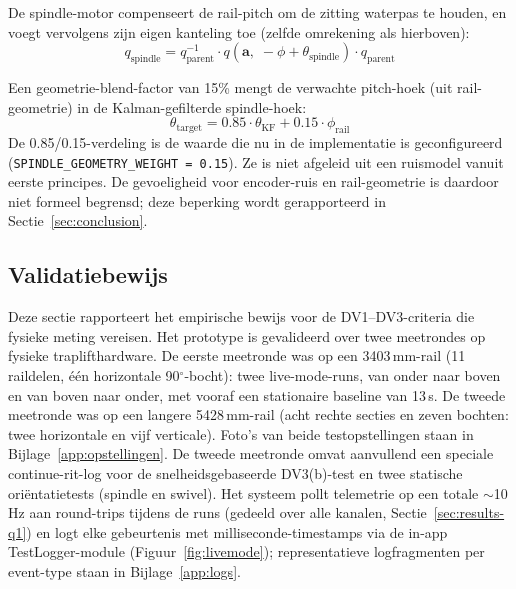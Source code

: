 \documentclass[10pt, a4paper, twocolumn]{article}
\begin{document}
De spindle-motor compenseert de rail-pitch om de zitting waterpas te houden, en
voegt vervolgens zijn eigen kanteling toe (zelfde omrekening als hierboven):
\begin{equation}
\label{eq:spindle-quat}
q_{\text{spindle}} = q_{\text{parent}}^{-1} \cdot q(\mathbf{a},\; -\phi + \theta_{\text{spindle}}) \cdot q_{\text{parent}}
\end{equation}

Een geometrie-blend-factor van 15\% mengt de verwachte pitch-hoek (uit
rail-geometrie) in de Kalman-gefilterde spindle-hoek:
\begin{equation}
\label{eq:spindle-blend}
\theta_{\text{target}} = 0.85 \cdot \theta_{\text{KF}} + 0.15 \cdot \phi_{\text{rail}}
\end{equation}
De 0.85/0.15-verdeling is de waarde die nu in de implementatie is
geconfigureerd (\texttt{SPINDLE\_GEOMETRY\_WEIGHT = 0.15}). Ze is niet afgeleid uit
een ruismodel vanuit eerste principes. De gevoeligheid voor encoder-ruis en
rail-geometrie is daardoor niet formeel begrensd; deze beperking wordt
gerapporteerd in Sectie~\ref{sec:conclusion}.

\subsection{Validatiebewijs}
\label{sec:results-validation}
Deze sectie rapporteert het empirische bewijs voor de DV1--DV3-criteria die
fysieke meting vereisen. Het prototype is gevalideerd over twee meetrondes op
fysieke traplifthardware. De eerste meetronde was op een 3403\,mm-rail (11
raildelen, één horizontale 90$^\circ$-bocht): twee live-mode-runs, van onder naar
boven en van boven naar onder, met vooraf een stationaire baseline van 13\,s. De
tweede meetronde was op een langere 5428\,mm-rail (acht rechte secties en zeven
bochten: twee horizontale en vijf verticale). Foto's van beide
testopstellingen staan in Bijlage~\ref{app:opstellingen}.
De tweede meetronde omvat aanvullend een speciale continue-rit-log voor de
snelheidsgebaseerde DV3(b)-test en twee statische oriëntatietests (spindle en
swivel). Het systeem pollt telemetrie op een totale $\sim$10\,Hz aan
round-trips tijdens de runs (gedeeld over alle kanalen,
Sectie~\ref{sec:results-q1}) en logt elke gebeurtenis met milliseconde-timestamps
via de in-app TestLogger-module (Figuur~\ref{fig:livemode}); representatieve
logfragmenten per event-type staan in Bijlage~\ref{app:logs}.
\end{document}

